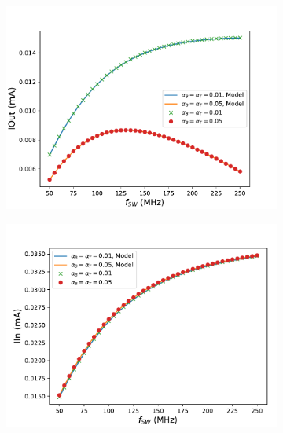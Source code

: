	\begin{figure}
		\centering
		\begin{subfigure}{0.48\linewidth}
			\includegraphics[width=\linewidth]{4Terminal/Figures/IOUT_1_BF.pdf}
		\end{subfigure}
		\begin{subfigure}{0.48\linewidth}
			\includegraphics[width=\linewidth]{4Terminal/Figures/IIN_1_BF.pdf}
		\end{subfigure}
		\begin{subfigure}{0.48\linewidth}

\end{subfigure}
\end{figure}
